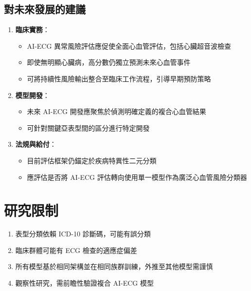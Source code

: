 \documentclass[12pt,a4paper]{article}
\begin{document}
\subsection{對未來發展的建議}

\begin{enumerate}
    \item \textbf{臨床實務}：
    \begin{itemize}
        \item AI-ECG 異常風險評估應促使全面心血管評估，包括心臟超音波檢查
        \item 即使無明顯心臟病，高分數仍獨立預測未來心血管事件
        \item 可將持續性風險輸出整合至臨床工作流程，引導早期預防策略
    \end{itemize}

    \item \textbf{模型開發}：
    \begin{itemize}
        \item 未來 AI-ECG 開發應聚焦於偵測明確定義的複合心血管結果
        \item 可針對關鍵亞表型間的區分進行特定開發
    \end{itemize}

    \item \textbf{法規與給付}：
    \begin{itemize}
        \item 目前評估框架仍錨定於疾病特異性二元分類
        \item 應評估是否將 AI-ECG 評估轉向使用單一模型作為廣泛心血管風險分類器
    \end{itemize}
\end{enumerate}

\section{研究限制}

\begin{enumerate}
    \item 表型分類依賴 ICD-10 診斷碼，可能有誤分類
    \item 臨床群體可能有 ECG 檢查的適應症偏差
    \item 所有模型基於相同架構並在相同族群訓練，外推至其他模型需謹慎
    \item 觀察性研究，需前瞻性驗證複合 AI-ECG 模型
\end{enumerate}
\end{document}
